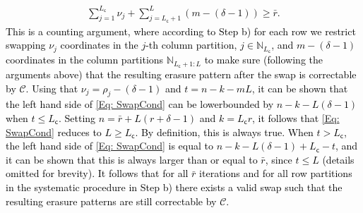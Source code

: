 \documentclass[twocolumn,conference]{IEEEtran}
\newcommand{\Nat}[1]{\mathbb{N}_{#1}}        %
\newcommand{\modify}[1]{\textcolor{black}{#1}}
\begin{document}
\modify{
\begin{align}
\label{Eq: SwapCond}
	\sum_{j=1}^{L_{\mathsf c}}\nu_j+\sum_{j=L_{\mathsf c}+1}^{L}(m-(\delta-1))\geq\bar r.
\end{align}
This is a counting argument, where according to Step b) {\textcolor{black}{for each row}} we restrict swapping $\nu_j$ coordinates in the $j$-th column partition, $j\in\Nat{L_{\mathsf c}}$, and $m-(\delta-1)$ coordinates in the column partitions $\Nat{L_{\mathsf c}+1:L}$ to make sure (following the arguments above) that the resulting erasure pattern after the swap is correctable by $\mathcal{C}$.  Using that $\nu_j=\rho_j-(\delta-1)$ and $t=n-k-mL$, it can be shown that the left hand side of  \eqref{Eq: SwapCond} can be lowerbounded by %
 $n-k-L(\delta-1)$ 
% 
 when $t \leq L_{\mathsf c}$. Setting  $n=\bar r+L(r+\delta-1)$ and $k=L_{\mathsf c}r$, it follows that \eqref{Eq: SwapCond}   reduces to $L\geq L_{\mathsf c}$. 
By definition, this is always true. When $t > L_{\mathsf c}$, the left hand side of  \eqref{Eq: SwapCond}  is equal to $n-k-L(\delta-1) + L_{\mathsf c} - t$, and it can be shown that this is always larger than or equal to $\bar{r}$, since $t \leq L$ (details omitted for brevity). \modify{It follows that for all $\bar{r}$ iterations  and for all row partitions in the systematic procedure in Step b) there exists a valid swap such that  the resulting erasure patterns are still correctable by $\mathcal C$.}}
%
%
%
%
%
%
%
\end{document}
